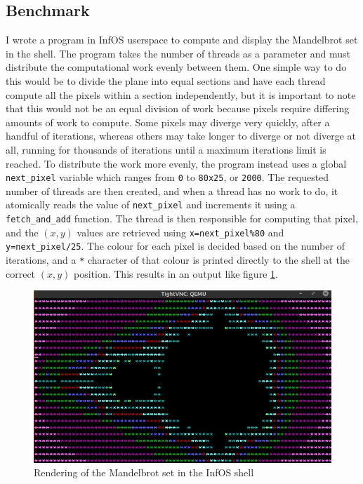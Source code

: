 \documentclass[bsc,frontabs,twoside,singlespacing,parskip,deptreport]{infthesis}     %
\begin{document}
\subsection{Benchmark}
I wrote a program in InfOS userspace to compute and display the Mandelbrot set in the shell. The program takes the number of threads as a parameter and must distribute the computational work evenly between them. One simple way to do this would be to divide the plane into equal sections and have each thread compute all the pixels within a section independently, but it is important to note that this would not be an equal division of work because pixels require differing amounts of work to compute. Some pixels may diverge very quickly, after a handful of iterations, whereas others may take longer to diverge or not diverge at all, running for thousands of iterations until a maximum iterations limit is reached. To distribute the work more evenly, the program instead uses a global \verb|next_pixel| variable which ranges from \verb|0| to \verb|80x25|, or \verb|2000|. The requested number of threads are then created, and when a thread has no work to do, it atomically reads the value of \verb|next_pixel| and increments it using a \verb|fetch_and_add| function. The thread is then responsible for computing that pixel, and the $(x,y)$ values are retrieved using \verb|x=next_pixel%80| and \verb|y=next_pixel/25|. The colour for each pixel is decided based on the number of iterations, and a \verb|*| character of that colour is printed directly to the shell at the correct $(x,y)$ position. This results in an output like figure \ref{terminal-output}.

\begin{figure}[h]
    \centering
    \includegraphics[scale=0.6]{figures/terminal-output.jpg}
    \caption{Rendering of the Mandelbrot set in the InfOS shell}
    \label{terminal-output}
\end{figure}
\end{document}
